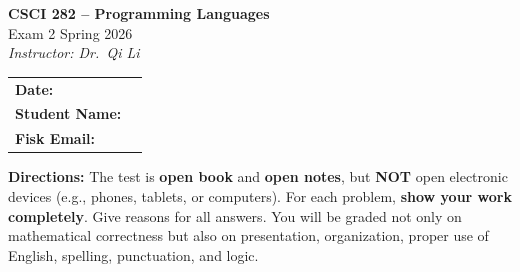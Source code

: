 \documentclass[12pt]{exam}
\begin{document}
\begin{center}
  {\LARGE \textbf{CSCI 282 -- Programming Languages}}\\[6pt]
  {\large Exam 2 \quad Spring 2026}\\[4pt]
  \textit{Instructor: Dr.\ Qi Li}\\[18pt]
  \begin{tabular}{ll}
    \textbf{Date:} & \underline{\hspace{6cm}} \\[10pt]
    \textbf{Student Name:} & \underline{\hspace{6cm}} \\[10pt]
    \textbf{Fisk Email:}   & \underline{\hspace{6cm}} \\[10pt]
  \end{tabular}
\end{center}

\vspace{12pt}
\noindent\textbf{Directions:} The test is \textbf{open book} and \textbf{open notes}, but
\textbf{NOT} open electronic devices (e.g., phones, tablets, or computers).
For each problem, \textbf{show your work completely}.
Give reasons for all answers. You will be graded not only on mathematical
correctness but also on presentation, organization, proper use of English,
spelling, punctuation, and logic.

\vspace{8pt}
\begin{center}
\gradetable[h][questions]
\end{center}

\newpage
\end{document}
